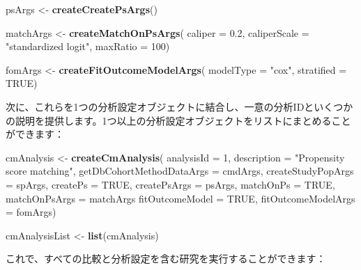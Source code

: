 \documentclass[
  11pt]{book}
\newenvironment{Shaded}{\begin{snugshade}}{\end{snugshade}}
\newcommand{\AttributeTok}[1]{\textcolor[rgb]{0.13,0.29,0.53}{#1}}
\newcommand{\ConstantTok}[1]{\textcolor[rgb]{0.56,0.35,0.01}{#1}}
\newcommand{\DecValTok}[1]{\textcolor[rgb]{0.00,0.00,0.81}{#1}}
\newcommand{\FloatTok}[1]{\textcolor[rgb]{0.00,0.00,0.81}{#1}}
\newcommand{\FunctionTok}[1]{\textcolor[rgb]{0.13,0.29,0.53}{\textbf{#1}}}
\newcommand{\NormalTok}[1]{#1}
\newcommand{\OtherTok}[1]{\textcolor[rgb]{0.56,0.35,0.01}{#1}}
\newcommand{\StringTok}[1]{\textcolor[rgb]{0.31,0.60,0.02}{#1}}
\theoremstyle{definition}
\theoremstyle{definition}
\theoremstyle{definition}
\theoremstyle{definition}
\theoremstyle{remark}
\begin{document}
\begin{Shaded}
\begin{Highlighting}[]
\NormalTok{psArgs }\OtherTok{\textless{}{-}} \FunctionTok{createCreatePsArgs}\NormalTok{()}

\NormalTok{matchArgs }\OtherTok{\textless{}{-}} \FunctionTok{createMatchOnPsArgs}\NormalTok{(}
  \AttributeTok{caliper =} \FloatTok{0.2}\NormalTok{,}
  \AttributeTok{caliperScale =} \StringTok{"standardized logit"}\NormalTok{,}
  \AttributeTok{maxRatio =} \DecValTok{100}\NormalTok{)}

\NormalTok{fomArgs }\OtherTok{\textless{}{-}} \FunctionTok{createFitOutcomeModelArgs}\NormalTok{(}
  \AttributeTok{modelType =} \StringTok{"cox"}\NormalTok{,}
  \AttributeTok{stratified =} \ConstantTok{TRUE}\NormalTok{)}
\end{Highlighting}
\end{Shaded}

次に、これらを1つの分析設定オブジェクトに結合し、一意の分析IDといくつかの説明を提供します。1つ以上の分析設定オブジェクトをリストにまとめることができます：

\begin{Shaded}
\begin{Highlighting}[]
\NormalTok{cmAnalysis }\OtherTok{\textless{}{-}} \FunctionTok{createCmAnalysis}\NormalTok{(}
  \AttributeTok{analysisId =} \DecValTok{1}\NormalTok{,}
  \AttributeTok{description =} \StringTok{"Propensity score matching"}\NormalTok{,}
  \AttributeTok{getDbCohortMethodDataArgs =}\NormalTok{ cmdArgs,}
  \AttributeTok{createStudyPopArgs =}\NormalTok{ spArgs,}
  \AttributeTok{createPs =} \ConstantTok{TRUE}\NormalTok{,}
  \AttributeTok{createPsArgs =}\NormalTok{ psArgs,}
  \AttributeTok{matchOnPs =} \ConstantTok{TRUE}\NormalTok{,}
  \AttributeTok{matchOnPsArgs =}\NormalTok{ matchArgs}
  \AttributeTok{fitOutcomeModel =} \ConstantTok{TRUE}\NormalTok{,}
  \AttributeTok{fitOutcomeModelArgs =}\NormalTok{ fomArgs)}

\NormalTok{cmAnalysisList }\OtherTok{\textless{}{-}} \FunctionTok{list}\NormalTok{(cmAnalysis)}
\end{Highlighting}
\end{Shaded}

これで、すべての比較と分析設定を含む研究を実行することができます：
\end{document}
